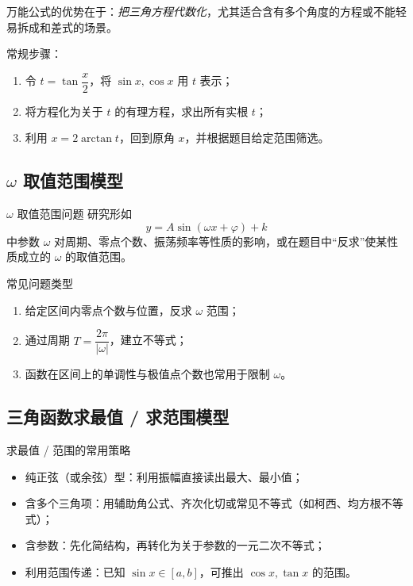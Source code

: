 \documentclass[a4paper,11pt]{ctexart}
\begin{document}
万能公式的优势在于：\emph{把三角方程代数化}，尤其适合含有多个角度的方程或不能轻易拆成和差式的场景。

常规步骤：
\begin{enumerate}
  \item 令 $t=\tan\dfrac{x}{2}$，将 $\sin x,\cos x$ 用 $t$ 表示；
  \item 将方程化为关于 $t$ 的有理方程，求出所有实根 $t$；
  \item 利用 $x=2\arctan t$，回到原角 $x$，并根据题目给定范围筛选。
\end{enumerate}

\subsection{\texorpdfstring{$\omega$}{omega} 取值范围模型}

\begin{definitionbox}{\texorpdfstring{$\omega$}{omega} 取值范围问题}
研究形如
\[
y = A\sin(\omega x + \varphi) + k
\]
中参数 $\omega$ 对周期、零点个数、振荡频率等性质的影响，或在题目中“反求”使某性质成立的 $\omega$ 的取值范围。
\end{definitionbox}

\begin{summarybox}{常见问题类型}
\begin{enumerate}
  \item 给定区间内零点个数与位置，反求 $\omega$ 范围；
  \item 通过周期 $T=\dfrac{2\pi}{|\omega|}$，建立不等式；
  \item 函数在区间上的单调性与极值点个数也常用于限制 $\omega$。
\end{enumerate}
\end{summarybox}

\subsection{三角函数求最值 / 求范围模型}

\begin{summarybox}{求最值 / 范围的常用策略}
\begin{itemize}
  \item 纯正弦（或余弦）型：利用振幅直接读出最大、最小值；
  \item 含多个三角项：用辅助角公式、齐次化切或常见不等式（如柯西、均方根不等式）；
  \item 含参数：先化简结构，再转化为关于参数的一元二次不等式；
  \item 利用范围传递：已知 $\sin x\in[a,b]$，可推出 $\cos x,\tan x$ 的范围。
\end{itemize}
\end{summarybox}
\end{document}
